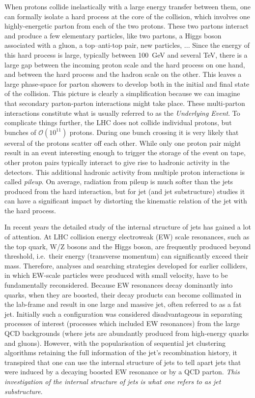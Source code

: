 When protons collide inelastically with a large energy transfer
between them, one can formally isolate a hard process at the core of
the collision, which involves one highly-energetic parton from each of
the two protons. These two partons interact and produce a few
elementary particles, like two partons, a Higgs boson associated with
a gluon, a top--anti-top pair, new particles, ... Since the energy of
this hard process is large, typically between 100~GeV and several TeV,
there is a large gap between the incoming proton scale and the hard
process on one hand, and between the hard process and the hadron scale
on the other. This leaves a large phase-space for parton showers to
develop both in the initial and final state of the collision.
%
This picture is clearly a simplification because we can imagine that
secondary parton-parton interactions might take place. These
multi-parton interactions constitute what is usually referred to as
the \emph{Underlying Event}.
%
To complicate things further, the LHC does not collide individual
protons, but bunches of $\mathcal{O}(10^{11})$ protons. During one
bunch crossing it is very likely that several of the protons scatter
off each other. While only one proton pair might result in an event
interesting enough to trigger the storage of the event on tape, other
proton pairs typically interact to give rise to hadronic activity in
the detectors. This additional hadronic activity from multiple proton
interactions is called \emph{pileup}. On average, radiation from
pileup is much softer than the jets produced from the hard
interaction, but for jet (and jet substructure) studies it can have a
significant impact by distorting the kinematic relation of the jet
with the hard process.


In recent years the detailed study of the internal structure of jets
has gained a lot of attention.  At LHC collision energy electroweak
(EW) scale resonances, such as the top quark, W/Z bosons and the Higgs
boson, are frequently produced beyond threshold, i.e.\ their energy
(transverse momentum) can significantly exceed their mass.
%
Therefore, analyses and searching strategies developed for earlier
colliders, in which EW-scale particles were produced with small
velocity, have to be fundamentally reconsidered.
%
Because EW resonances decay dominantly into quarks, when they are
boosted, their
decay products can become collimated in the lab-frame and result in one large and massive jet, often referred to
as a fat jet. Initially such a configuration was considered
disadvantageous in separating processes of interest (\ie processes
which included EW resonances) from the large QCD backgrounds (where
jets are abundantly produced from high-energy quarks and
gluons).
%
However, with the popularisation of sequential jet clustering
algorithms retaining the full information of the jet's recombination
history, it transpired that one can use the internal structure of jets
to tell apart jets that were induced by a decaying boosted EW
resonance or by a QCD parton.
%
{\em This investigation of the internal structure of jets is what one
  refers to as jet substructure}.

